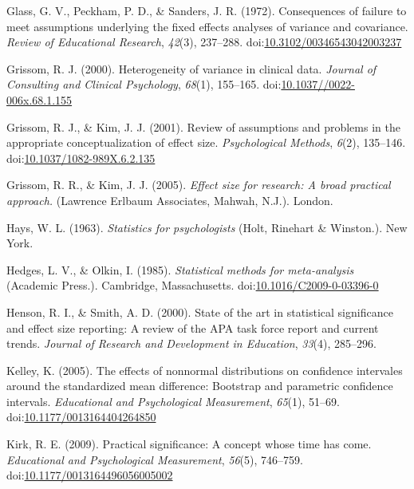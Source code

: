 \documentclass[man]{apa6}
\begin{document}
\leavevmode\hypertarget{ref-Glass_et_al_1972}{}%
Glass, G. V., Peckham, P. D., \& Sanders, J. R. (1972). Consequences of failure to meet assumptions underlying the fixed effects analyses of variance and covariance. \emph{Review of Educational Research}, \emph{42}(3), 237--288. doi:\href{https://doi.org/10.3102/00346543042003237}{10.3102/00346543042003237}

\leavevmode\hypertarget{ref-Grissom_2000}{}%
Grissom, R. J. (2000). Heterogeneity of variance in clinical data. \emph{Journal of Consulting and Clinical Psychology}, \emph{68}(1), 155--165. doi:\href{https://doi.org/10.1037//0022-006x.68.1.155}{10.1037//0022-006x.68.1.155}

\leavevmode\hypertarget{ref-Grissom_Kim_2001}{}%
Grissom, R. J., \& Kim, J. J. (2001). Review of assumptions and problems in the appropriate conceptualization of effect size. \emph{Psychological Methods}, \emph{6}(2), 135--146. doi:\href{https://doi.org/10.1037/1082-989X.6.2.135}{10.1037/1082-989X.6.2.135}

\leavevmode\hypertarget{ref-Grissom_and_kim_2005}{}%
Grissom, R. R., \& Kim, J. J. (2005). \emph{Effect size for research: A broad practical approach.} (Lawrence Erlbaum Associates, Mahwah, N.J.). London.

\leavevmode\hypertarget{ref-Hays_1963}{}%
Hays, W. L. (1963). \emph{Statistics for psychologists} (Holt, Rinehart \& Winston.). New York.

\leavevmode\hypertarget{ref-Hedges_Olkin_1985}{}%
Hedges, L. V., \& Olkin, I. (1985). \emph{Statistical methods for meta-analysis} (Academic Press.). Cambridge, Massachusetts. doi:\href{https://doi.org/10.1016/C2009-0-03396-0}{10.1016/C2009-0-03396-0}

\leavevmode\hypertarget{ref-Henson_Smith_2000}{}%
Henson, R. I., \& Smith, A. D. (2000). State of the art in statistical significance and effect size reporting: A review of the APA task force report and current trends. \emph{Journal of Research and Development in Education}, \emph{33}(4), 285--296.

\leavevmode\hypertarget{ref-Kelley_2005}{}%
Kelley, K. (2005). The effects of nonnormal distributions on confidence intervales around the standardized mean difference: Bootstrap and parametric confidence intervals. \emph{Educational and Psychological Measurement}, \emph{65}(1), 51--69. doi:\href{https://doi.org/10.1177/0013164404264850}{10.1177/0013164404264850}

\leavevmode\hypertarget{ref-Kirk_2009}{}%
Kirk, R. E. (2009). Practical significance: A concept whose time has come. \emph{Educational and Psychological Measurement}, \emph{56}(5), 746--759. doi:\href{https://doi.org/10.1177/0013164496056005002\%20}{10.1177/0013164496056005002 }
\end{document}
